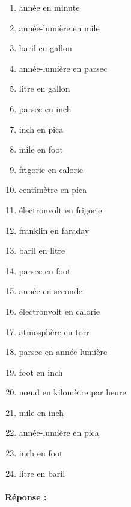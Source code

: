\documentclass[11pt,a4paper]{article}
\begin{document}
\noindent\begin{minipage}[t]{7cm}
\begin{enumerate}
\item année en minute
\item année-lumière en mile
\item baril en gallon
\item année-lumière en parsec
\item litre en gallon
\item parsec en inch
\item inch en pica
\item mile en foot
\item frigorie en calorie
\item centimètre en pica
\item électronvolt en frigorie
\item franklin en faraday
\end{enumerate}
\end{minipage}
\hfill
\begin{minipage}[t]{7cm}
\begin{enumerate}\setcounter{enumi}{12}
\item baril en litre
\item parsec en foot
\item année en seconde
\item électronvolt en calorie
\item atmosphère en torr
\item parsec en année-lumière
\item foot en inch
\item n\oe ud en kilomètre par heure
\item mile en inch
\item année-lumière en pica
\item inch en foot
\item litre en baril
\end{enumerate}
\end{minipage}

\paragraph{Réponse :}\mbox{}

\noindent\framebox[0.9955\textwidth]{$\rule{0cm}{0.5\textheight}$}

\end{document}
